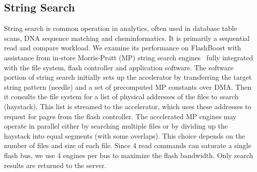 %

\subsection{String Search}

String search is common operation in analytics, often used in
database table scans, DNA sequence matching and cheminformatics. It is 
primarily a sequential read and compare workload. We
examine its performance on FlashBoost with assistance from in-store Morris-Pratt (MP) 
string search engines~\cite{mpalgo} fully integrated with the file system, flash controller
and application software.  The software portion of string search initially sets
up the accelerator by transferring the target string pattern (needle) and a set
of precomputed MP constants over DMA. Then it consults the file system for a
list of physical addresses of the files to search (haystack).  This list is
streamed to the accelerator, which uses these addresses to request for pages
from the flash controller.  The accelerated MP engines may operate in parallel
either by searching multiple files or by dividing up the haystack into equal
segments (with some overlaps). This choice depends on the number of files and
size of each file. Since 4 read commands can saturate a single flash bus, we
use 4 engines per bus to maximize the flash bandwidth. Only
search results are returned to the server. 
